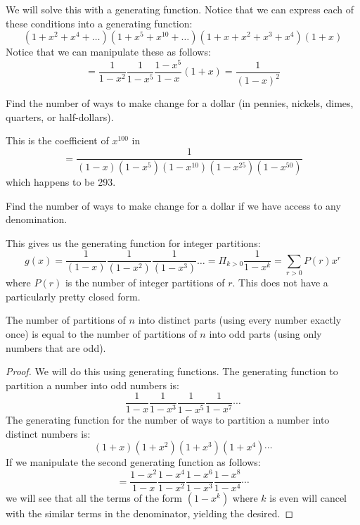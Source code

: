 \documentclass[11pt,twosided]{article}
\begin{document}
\begin{solution}
We will solve this with a generating function. Notice that we can express each of these conditions into a generating function: 
\[
	(1 + x^2 + x^4 + \ldots ) (1 + x^5 + x^10 + \ldots ) (1+x+x^2+x^3+x^4)(1+x)
\]
Notice that we can manipulate these as follows: 
\[
	= \frac{1}{1-x^2} \frac{1}{1-x^5} \frac{1-x^5}{1-x} (1+x) = \frac{1}{(1-x)^2}
\]
\end{solution}

\begin{problem}
	Find the number of ways to make change for a dollar (in pennies, nickels, dimes, quarters, or half-dollars). 
\end{problem}
\begin{solution}
This is the coefficient of $x^{100}$ in 
\[
	= \frac{1}{(1-x)(1-x^5)(1-x^{10})(1-x^{25})(1-x^{50})}
\]
which happens to be 293. 
\end{solution}
\begin{problem}
	Find the number of ways to make change for a dollar if we have access to any denomination. 
\end{problem}
\begin{solution}
This gives us the generating function for integer partitions: 
\[
	g(x) = \frac{1}{(1-x)}\frac{1}{(1-x^2)}\frac{1}{(1-x^3)} \ldots = \Pi_{k>0} \frac{1}{1-x^k} = \sum_{r>0} P(r) x^r
\]
where $P(r)$ is the number of integer partitions of $r$. This does not have a particularly pretty closed form. 
\end{solution}

\begin{theorem}
The number of partitions of $n$ into distinct parts (using every number exactly once) is equal to the number of partitions of $n$ into odd parts (using only numbers that are odd). 
\end{theorem}

\begin{proof}
We will do this using generating functions. The generating function to partition a number into odd numbers is: 
\[
	\frac{1}{1-x} \frac{1}{1-x^3} \frac{1}{1-x^5} \frac{1}{1-x^7} \cdots
\]
The generating function for the number of ways to partition a number into distinct numbers is: 
\[
	(1+x)(1+x^2)(1+x^3)(1+x^4) \cdots 
\]
If we manipulate the second generating function as follows: 
\[
 = \frac{1-x^2}{1-x} \frac{1-x^4}{1-x^2} \frac{1-x^6}{1-x^3} \frac{1-x^8}{1-x^4} \cdots 
\] 
we will see that all the terms of the form $(1-x^k)$ where $k$ is even will cancel with the similar terms in the denominator, yielding the desired. 

\end{proof}
\end{document}

